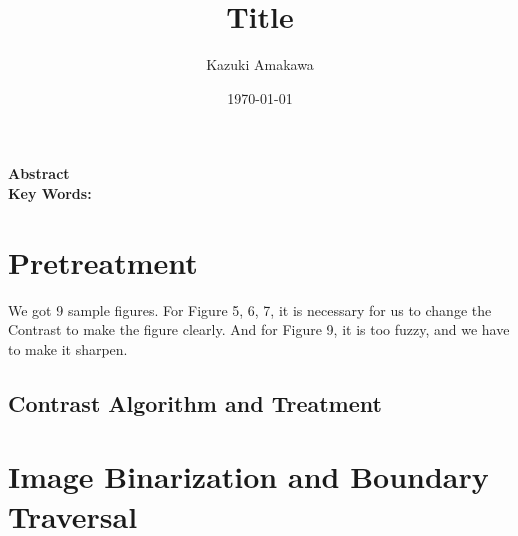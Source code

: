 \documentclass[12pt]{article}
\title{Title}
\author{Kazuki Amakawa}
\date{\today}
\theoremstyle{plain}
\begin{document}
\maketitle
\noindent \textbf{Abstract}\\

\noindent \textbf{Key Words:} \\
\newpage

\section{Pretreatment}
We got 9 sample figures. For Figure 5, 6, 7, it is necessary for us to change the Contrast to make the figure clearly. And for Figure 9, it is too fuzzy, and we have to make it sharpen.
\subsection{Contrast Algorithm and Treatment}


\section{Image Binarization and Boundary Traversal}


\newpage
\medskip


\end{document}
